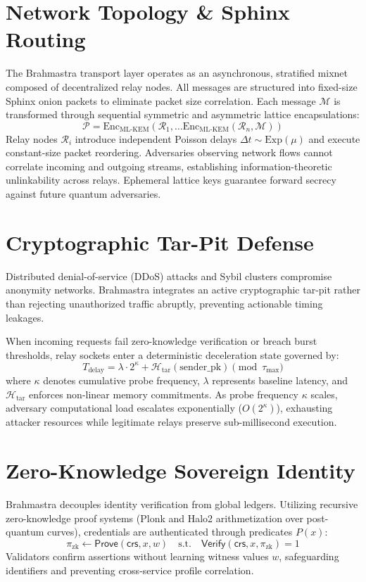 \documentclass[conference,leqno]{IEEEtran}
\begin{document}
\section{Network Topology \& Sphinx Routing}
The Brahmastra transport layer operates as an asynchronous, stratified mixnet composed of decentralized relay nodes. All messages are structured into fixed-size Sphinx onion packets to eliminate packet size correlation. Each message $\mathcal{M}$ is transformed through sequential symmetric and asymmetric lattice encapsulations:
\begin{equation}
\mathcal{P} = \mathrm{Enc}_{\text{ML-KEM}}(\mathcal{R}_1, \dots \mathrm{Enc}_{\text{ML-KEM}}(\mathcal{R}_n, \mathcal{M}))
\end{equation}
Relay nodes $\mathcal{R}_i$ introduce independent Poisson delays $\Delta t \sim \mathrm{Exp}(\mu)$ and execute constant-size packet reordering. Adversaries observing network flows cannot correlate incoming and outgoing streams, establishing information-theoretic unlinkability across relays. Ephemeral lattice keys guarantee forward secrecy against future quantum adversaries.

\section{Cryptographic Tar-Pit Defense}
Distributed denial-of-service (DDoS) attacks and Sybil clusters compromise anonymity networks. Brahmastra integrates an active cryptographic tar-pit rather than rejecting unauthorized traffic abruptly, preventing actionable timing leakages.

When incoming requests fail zero-knowledge verification or breach burst thresholds, relay sockets enter a deterministic deceleration state governed by:
\begin{equation}
T_{\text{delay}} = \lambda \cdot 2^{\kappa} + \mathcal{H}_{\text{tar}}(\text{sender\_pk}) \pmod{\tau_{\max}}
\end{equation}
where $\kappa$ denotes cumulative probe frequency, $\lambda$ represents baseline latency, and $\mathcal{H}_{\text{tar}}$ enforces non-linear memory commitments. As probe frequency $\kappa$ scales, adversary computational load escalates exponentially ($O(2^\kappa)$), exhausting attacker resources while legitimate relays preserve sub-millisecond execution.

\section{Zero-Knowledge Sovereign Identity}
Brahmastra decouples identity verification from global ledgers. Utilizing recursive zero-knowledge proof systems (Plonk and Halo2 arithmetization over post-quantum curves), credentials are authenticated through predicates $P(x)$:
\begin{equation}
\pi_{\text{zk}} \leftarrow \mathsf{Prove}(\mathsf{crs}, x, w) \quad \text{s.t.} \quad \mathsf{Verify}(\mathsf{crs}, x, \pi_{\text{zk}}) = 1
\end{equation}
Validators confirm assertions without learning witness values $w$, safeguarding identifiers and preventing cross-service profile correlation.
\end{document}
